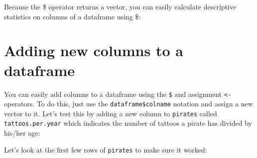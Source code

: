 \documentclass{tufte-book}\usepackage[]{graphicx}\usepackage[]{color}
\makeatletter
\newcommand{\hlopt}[1]{\textcolor[rgb]{0,0,0}{#1}}%
\newcommand{\hlstd}[1]{\textcolor[rgb]{0.345,0.345,0.345}{#1}}%
\newcommand{\hlkwb}[1]{\textcolor[rgb]{0.69,0.353,0.396}{#1}}%
\newcommand{\hlkwd}[1]{\textcolor[rgb]{0.737,0.353,0.396}{\textbf{#1}}}%
\newenvironment{kframe}{%
 \def\at@end@of@kframe{}%
 \ifinner\ifhmode%
  \def\at@end@of@kframe{\end{minipage}}%
  \begin{minipage}{\columnwidth}%
 \fi\fi%
 \def\FrameCommand##1{\hskip\@totalleftmargin \hskip-\fboxsep
 \colorbox{shadecolor}{##1}\hskip-\fboxsep
     \hskip-\linewidth \hskip-\@totalleftmargin \hskip\columnwidth}%
 \MakeFramed {\advance\hsize-\width
   \@totalleftmargin\z@ \linewidth\hsize
   \@setminipage}}%
 {\par\unskip\endMakeFramed%
 \at@end@of@kframe}
\newenvironment{knitrout}{}{} %
\makeatother
\begin{document}
\begin{footnotesize}
Because the \$ operator returns a vector, you can easily calculate descriptive statistics on columns of a dataframe using \$:


\section{Adding new columns to a dataframe}

You can easily add columns to a dataframe using the \texttt{\$} and assignment \texttt{<-} operators. To do this, just use the \texttt{dataframe\$colname} notation and assign a new vector to it. Let's test this by adding a new column to \texttt{pirates} called \texttt{tattoos.per.year} which indicates the number of tattoos a pirate has divided by his/her age:


Let's look at the first few rows of \texttt{pirates} to make sure it worked:


\end{footnotesize}
\end{document}
